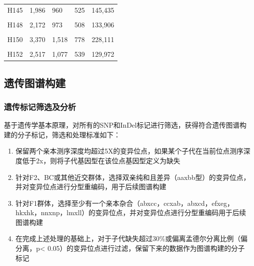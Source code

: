 \documentclass[
  a4paper,
  titlepage]{article}
\providecommand{\tightlist}{%
  \setlength{\itemsep}{0pt}\setlength{\parskip}{0pt}}
\begin{document}
\begin{longtable}[t]{lllll}
H145 & 1,986 & 960 & 525 & 145,435\\
 
\cellcolor{gray!6}{H146} & \cellcolor{gray!6}{2,285} & \cellcolor{gray!6}{1,012} & \cellcolor{gray!6}{525} & \cellcolor{gray!6}{141,569}\\
 
H148 & 2,172 & 973 & 508 & 133,906\\
 
\cellcolor{gray!6}{H149} & \cellcolor{gray!6}{1,818} & \cellcolor{gray!6}{881} & \cellcolor{gray!6}{447} & \cellcolor{gray!6}{131,977}\\
 
H150 & 3,370 & 1,518 & 778 & 228,111\\
 
\cellcolor{gray!6}{H151} & \cellcolor{gray!6}{3,072} & \cellcolor{gray!6}{1,332} & \cellcolor{gray!6}{674} & \cellcolor{gray!6}{197,913}\\
 
H152 & 2,517 & 1,077 & 539 & 129,972\\*
\end{longtable}

\hypertarget{ux9057ux4f20ux56feux8c31ux6784ux5efa}{%
\subsection{遗传图谱构建}\label{ux9057ux4f20ux56feux8c31ux6784ux5efa}}

\hypertarget{ux9057ux4f20ux6807ux8bb0ux7b5bux9009ux53caux5206ux6790}{%
\subsubsection{遗传标记筛选及分析}\label{ux9057ux4f20ux6807ux8bb0ux7b5bux9009ux53caux5206ux6790}}

基于遗传学基本原理，对所有的SNP和InDel标记进行筛选，获得符合遗传图谱构建的分子标记，筛选和处理标准如下：

\begin{enumerate}
\def\labelenumi{\arabic{enumi}.}
\tightlist
\item
  保留两个亲本测序深度均超过5X的变异位点，如果某个子代在当前位点测序深度低于2x，则将子代基因型在该位点基因型定义为缺失
\item
  针对F2、BC或其他近交群体，选择双亲纯和且差异（aaxbb型）的变异位点，并对变异位点进行分型重编码，用于后续图谱构建
\item
  针对F1群体，选择至少有一个亲本杂合（abxcc，ccxab，abxcd，efxeg，hkxhk，nnxnp，lmxll）的变异位点，并对变异位点进行分型重编码用于后续图谱构建
\item
  在完成上述处理的基础上，对于子代缺失超过30\%或偏离孟德尔分离比例（偏分离，p\textless{} 0.05）的变异位点进行过滤，保留下来的数据作为图谱构建的分子标记
\end{enumerate}
\end{document}

